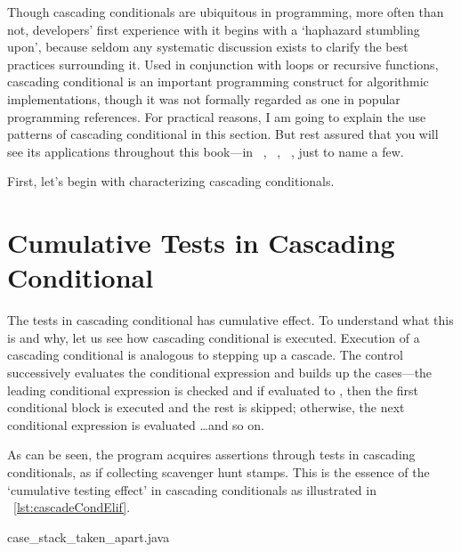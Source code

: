 Though cascading conditionals are ubiquitous in programming,
more often than not, developers' first experience with it begins with a `haphazard stumbling upon',
because seldom any systematic discussion exists to clarify the best practices surrounding it.
Used in conjunction with loops or recursive functions,
cascading conditional is an important programming construct for algorithmic implementations,
though it was not formally regarded as one in popular programming references.
For practical reasons, I am going to explain the use patterns of cascading conditional in this
section.
But rest assured that you will see its applications throughout this book---in
~, ~, ~, just to name a few.


First, let's begin with characterizing cascading conditionals.


\section{Cumulative Tests in Cascading Conditional}\label{sec:cumulativetests}

The tests in cascading conditional has cumulative effect.
To understand what this is and why, let us see how cascading conditional is executed.
Execution of a cascading conditional is analogous to stepping up a cascade.
The control successively evaluates the conditional expression and builds up the cases---the
leading conditional expression is checked and if evaluated to , then the
first conditional block is executed and the rest is skipped;
otherwise, the next conditional expression is evaluated \ldots and so on.


As can be seen, the program acquires  assertions through tests in cascading
conditionals, as if collecting scavenger hunt stamps.
This is the essence of the `cumulative testing effect' in cascading conditionals as
illustrated in ~\autoref{lst:cascadeCondElif}.


\begin{clisting}[tbh]
    \centering
    
    {case_stack_taken_apart.java}
\end{clisting}

